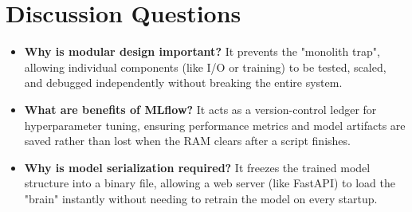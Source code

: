 \documentclass[12pt,a4paper]{article}
\begin{document}
\section*{Discussion Questions}
\begin{itemize}
\item \textbf{Why is modular design important?} It prevents the "monolith trap", allowing individual components (like I/O or training) to be tested, scaled, and debugged independently without breaking the entire system.
\item \textbf{What are benefits of MLflow?} It acts as a version-control ledger for hyperparameter tuning, ensuring performance metrics and model artifacts are saved rather than lost when the RAM clears after a script finishes.
\item \textbf{Why is model serialization required?} It freezes the trained model structure into a binary file, allowing a web server (like FastAPI) to load the "brain" instantly without needing to retrain the model on every startup.
\end{itemize}
\end{document}
